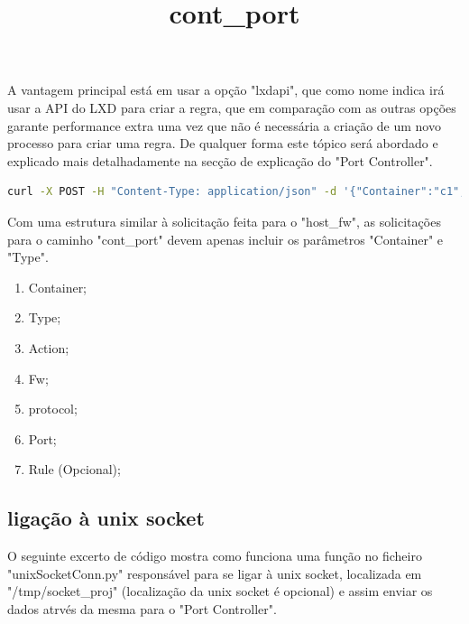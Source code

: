 A vantagem principal está em usar a opção "lxdapi", que como nome indica irá usar a API do LXD para
criar a regra, que em comparação com as outras opções garante performance extra uma vez que não é necessária
a criação de um novo processo para criar uma regra. De qualquer forma este tópico será abordado e explicado mais detalhadamente 
na secção de explicação do "Port Controller". \\


\title*{\textbf{cont\_port}}

\begin{lstlisting}[language=Bash, caption={Exemplo de solicitação para a firewal do sistema host para associar um IP externo a umIp de container de modo a criar conectividade}]
    curl -X POST -H "Content-Type: application/json" -d '{"Container":"c1","Type":"lxc","Action":"OpenPort","Fw":"ipt", "Protocol":"tcp","Port":"22"}' http://localhost:5000/cont_port
\end{lstlisting}

Com uma estrutura similar à solicitação feita para o "host\_fw", as solicitações para o caminho "cont\_port"
devem apenas incluir os parâmetros "Container" e "Type".
\begin{enumerate}
    \item Container;
    \item Type;
    \item Action;
    \item Fw;
    \item protocol;
    \item Port;
    \item Rule (Opcional);
\end{enumerate}




\subsection{ligação à unix socket}

O seguinte excerto de código mostra como funciona uma função no ficheiro "unixSocketConn.py" responsável
para se ligar à unix socket, localizada em "/tmp/socket\_proj" (localização da unix socket
é opcional) e assim enviar os dados atrvés da mesma para o "Port Controller".

